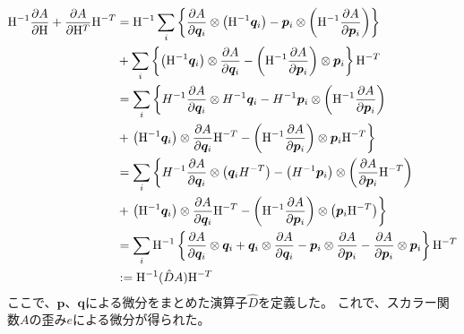 \documentclass[11pt,a4paper,uplatex]{jsarticle}
\begin{document}
\begin{align}
    {\rm H}^{-1} \frac{\partial A}{\partial {\rm H}} + \frac{\partial A}{\partial {\rm H}^{T}}{\rm H}^{-T} 
    &= {\rm H}^{-1} \sum_{i}\left\{ 
      \frac{\partial A }{\partial \bm{q}_{i}} \otimes \left({\rm H}^{-1} \bm{q}_{i} \right) 
      - \bm{p}_{i} \otimes \left( {\rm H}^{-1} \frac{\partial A }{\partial \bm{p}_{i}} \right)
    \right\}\\
    &+ \sum_{i}  \left\{ \left({\rm H}^{-1} \bm{q}_{i} \right) \otimes \frac{\partial A }{\partial \bm{q}_{i}} 
        - \left( {\rm H}^{-1} \frac{\partial A }{\partial \bm{p}_{i}} \right) \otimes \bm{p}_{i} \right\}{\rm H}^{-T}  \\
    &= \sum_{i} \left\{ H^{-1} \frac{\partial A }{\partial \bm{q}_{i}} \otimes H^{-1} \bm{q}_{i} - H^{-1} \bm{p}_{i} \otimes \left( {\rm H}^{-1} \frac{\partial A }{\partial \bm{p}_{i}} \right) \right. \\
    &+ \left. \left({\rm H}^{-1} \bm{q}_{i}\right) \otimes \frac{\partial A }{\partial \bm{q}_{i}} 
     {\rm H}^{-T}   
    - \left( {\rm H}^{-1} \frac{\partial A }{\partial \bm{p}_{i}} \right) \otimes \bm{p}_{i} {\rm H}^{-T} \right\} \\
    &= \sum_{i}  \left\{ H^{-1} \frac{\partial A }{\partial \bm{q}_{i}} \otimes \left( \bm{q}_{i} H^{-T}\right) 
    - \left( H^{-1} \bm{p}_{i} \right) \otimes \left( \frac{\partial A }{\partial \bm{p}_{i}} {\rm H}^{-T} \right)  \right. \\
    &+ \left. \left({\rm H}^{-1} \bm{q}_{i} \right) \otimes \frac{\partial A }{\partial \bm{q}_{i}} 
    {\rm H}^{-T} 
    - \left( {\rm H}^{-1} \frac{\partial A }{\partial \bm{p}_{i}} \right) \otimes\left( \bm{p}_{i} {\rm H}^{-T} \right) \right\}\\
    &= \sum_{i} {\rm H}^{-1}  \left\{ \frac{\partial A }{\partial \bm{q}_{i}} \otimes \bm{q}_{i}
    + \bm{q}_{i} \otimes \frac{\partial A }{\partial \bm{q}_{i}} 
    - \bm{p}_{i} \otimes \frac{\partial A }{\partial \bm{p}_{i}} 
    - \frac{\partial A }{\partial \bm{p}_{i}} \otimes \bm{p}_{i} \right\}{\rm H}^{-T}\\
    &:= {\rm H}^{-1} (\hat{D} A) {\rm H}^{-T} 
\end{align}
ここで、$\bm{p}$、$\bm{q}$による微分をまとめた演算子$\hat{D}$を定義した。
これで、スカラー関数$A$の歪み$e$による微分が得られた。

\end{document}
